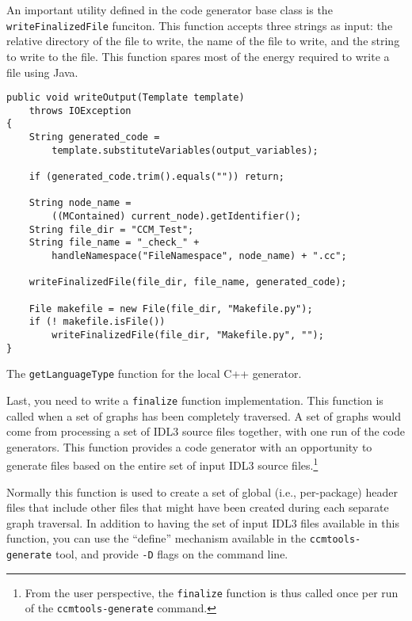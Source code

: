 An important utility defined in the code generator base class is the {\tt
writeFinalizedFile} funciton. This function accepts three strings as input: the
relative directory of the file to write, the name of the file to write, and the
string to write to the file. This function spares most of the energy required to
write a file using Java.

\begin{Example}
\begin{minifbox}
\begin{small}
\begin{verbatim}
public void writeOutput(Template template)
    throws IOException
{
    String generated_code =
        template.substituteVariables(output_variables);

    if (generated_code.trim().equals("")) return;

    String node_name =
        ((MContained) current_node).getIdentifier();
    String file_dir = "CCM_Test";
    String file_name = "_check_" +
        handleNamespace("FileNamespace", node_name) + ".cc";

    writeFinalizedFile(file_dir, file_name, generated_code);

    File makefile = new File(file_dir, "Makefile.py");
    if (! makefile.isFile())
        writeFinalizedFile(file_dir, "Makefile.py", "");
}
\end{verbatim}
\end{small}
\end{minifbox}
\caption{The {\tt getLanguageType} function for the local C++ generator.}
\label{example:component-c++-mirror-write-function}
\end{Example}

Last, you need to write a {\tt finalize} function implementation. This function
is called when a set of graphs has been completely traversed. A set of graphs
would come from processing a set of IDL3 source files together, with one run of
the code generators. This function provides a code generator with an opportunity
to generate files based on the entire set of input IDL3 source
files.\footnote{From the user perspective, the {\tt finalize} function is thus
called once per run of the {\tt ccmtools-generate} command.}

Normally this function is used to create a set of global (i.e., per-package)
header files that include other files that might have been created during each
separate graph traversal. In addition to having the set of input IDL3 files
available in this function, you can use the ``define'' mechanism available in
the {\tt ccmtools-generate} tool, and provide {\tt -D} flags on the command
line.

